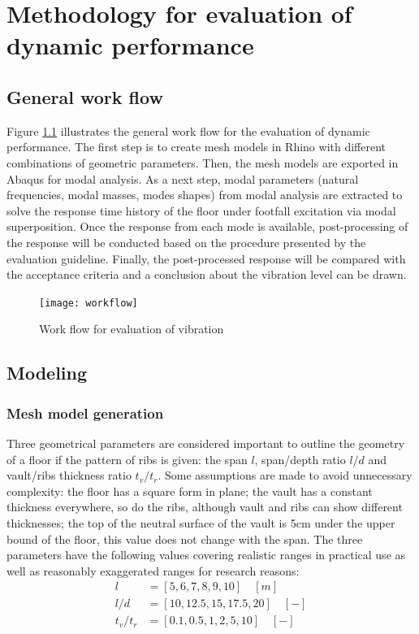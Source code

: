 \chapter{Methodology for evaluation of dynamic performance}
\label{chap3}

\section{General work flow}
Figure \ref{fig:workflow} illustrates the general work flow for the evaluation of dynamic performance. The first step is to create mesh models in Rhino with different combinations of geometric parameters. Then, the mesh models are exported in Abaqus for modal analysis. As a next step, modal parameters (natural frequencies, modal masses, modes shapes) from modal analysis are extracted to solve the response time history of the floor under footfall excitation via modal superposition. Once the response from each mode is available, post-processing of the response will be conducted based on the procedure presented by the evaluation guideline. Finally, the post-processed response will be compared with the acceptance criteria and a conclusion about the vibration level can be drawn.

\begin{figure}[H]
\centering
\texttt{[image: workflow]}
\caption{Work flow for evaluation of vibration}
\label{fig:workflow}
\end{figure}

\section{Modeling}
\subsection{Mesh model generation}
Three geometrical parameters are considered important to outline the geometry of a floor if the pattern of ribs is given: the span $l$, span/depth ratio $l/d$ and vault/ribs thickness ratio $t_v/t_r$. Some assumptions are made to avoid unnecessary complexity: the floor has a square form in plane; the vault has a constant thickness everywhere, so do the ribs, although vault and ribs can show different thicknesses; the top of the neutral surface of the vault is 5cm under the upper bound of the floor, this value does not change with the span. The three parameters have the following values covering realistic ranges in practical use as well as reasonably exaggerated ranges for research reasons:
\begin{align*}
    l&=[5,6,7,8,9,10]\quad[m]\\
    l/d&=[10,12.5,15,17.5,20]\quad[-]\\
    t_v/t_r&=[0.1,0.5,1,2,5,10]\quad[-]
\end{align*}

